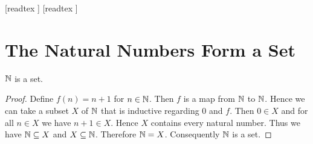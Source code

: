\documentclass[10pt]{article}
\begin{document}
  \begin{imports}
    \begin{forthel}
      [readtex ]
      [readtex ]
    \end{forthel}
  \end{imports}


  \section*{The Natural Numbers Form a Set}

  \begin{forthel}
    \begin{proposition}
      $\mathbb{N}$ is a set.
    \end{proposition}
    \begin{proof}
      Define $f(n) = n + 1$ for $n \in \mathbb{N}$.
      Then $f$ is a map from $\mathbb{N}$ to $\mathbb{N}$.
      Hence we can take a subset $X$ of $\mathbb{N}$ that is inductive regarding
      $0$ and $f$.
      Then $0 \in X$ and for all $n \in X$ we have $n + 1 \in X$.
      Hence $X$ contains every natural number.
      Thus we have $\mathbb{N} \subseteq X$ and $X \subseteq \mathbb{N}$.
      Therefore $\mathbb{N} = X$.
      Consequently $\mathbb{N}$ is a set.
    \end{proof}
  \end{forthel}
\end{document}
